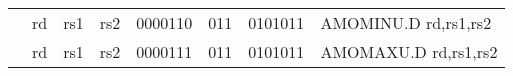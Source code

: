 \begin{table}[p]
\begin{small}
\begin{center}
\begin{tabular}{rccccccccccl}
&
\multicolumn{1}{|c|}{rd} &
\multicolumn{1}{c|}{rs1} &
\multicolumn{1}{c|}{rs2} &
\multicolumn{4}{c|}{0000110} &
\multicolumn{2}{c|}{011} &
\multicolumn{1}{c|}{0101011} & AMOMINU.D rd,rs1,rs2 \\
\cline{2-11}
  

&
\multicolumn{1}{|c|}{rd} &
\multicolumn{1}{c|}{rs1} &
\multicolumn{1}{c|}{rs2} &
\multicolumn{4}{c|}{0000111} &
\multicolumn{2}{c|}{011} &
\multicolumn{1}{c|}{0101011} & AMOMAXU.D rd,rs1,rs2 \\
\cline{2-11}
  

\end{tabular}
\end{center}
\end{small}

\label{instr-table}
\end{table}
  

\newpage

